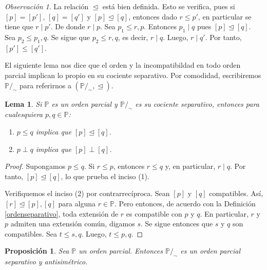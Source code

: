 \documentclass[11pt]{unam_tesis1}
\theoremstyle{MyThmStyle}
\theoremstyle{definition}
\theoremstyle{plain}
\newtheorem{lemma}[definition]{Lema}
\newtheorem{proposition}[definition]{Proposici\'on}
\theoremstyle{remark}
\newtheorem*{remark}{Observaci\'on}
\let\leq\leqslant
\begin{document}
\begin{remark}
La relaci\'on $\trianglelefteq$ est\'a bien definida. Esto se verifica, pues si $[p]=[p']$, $[q]=[q']$ y $[p]\trianglelefteq [q]$, entonces dado $r\leq p'$, en particular se tiene que $r\mid p'$. De donde $r\mid p$. Sea $p_1\leq r,p$. Entonces $p_1\mid q$ pues $[p]\trianglelefteq [q]$. Sea $p_2\leq p_1,q$. Se sigue que $p_2\leq r,q$, es decir, $r\mid q$. Luego, $r\mid q'$. Por tanto, $[p']\leq [q']$.
\end{remark}

El siguiente lema nos dice que el orden y la incompatibildad en todo orden parcial implican lo propio en su cociente separativo. Por comodidad, escribiremos $\mathbb P/_\sim$ para referirnos a $(\mathbb{P}/_\sim,\trianglelefteq)$.

\begin{lemma}\label{preservacionseparativa}
Si $\mathbb P$ es un orden parcial y $\mathbb P/_\sim$ es su cociente separativo, entonces para cualesquiera $p,q\in \mathbb P$:
\begin{enumerate}
\item $p\leq q$ implica que $[p]\trianglelefteq [q]$.
\item $p\perp q$ implica que $[p]\perp [q]$.
\end{enumerate}
\end{lemma}

\begin{proof}
Supongamos $p\leq q$. Si $r\leq p$, entonces $r\leq q$ y, en particular, $r\mid q$. Por tanto, $[p]\trianglelefteq [q]$, lo que prueba el inciso (1).

Verifiquemos el inciso (2) por contrarrec\'iproca. Sean $[p]$ y  $[q]$ compatibles. As\'i, $[r]\trianglelefteq [p],[q]$ para alguna $r\in \mathbb P$. Pero entonces, de acuerdo con la Definici\'on \ref{ordenseparativo}, toda extensi\'on de $r$ es compatible con $p$ y $q$. En particular, $r$ y $p$ admiten una extensi\'on com\'un, digamos $s$. Se sigue entonces que $s$ y $q$ son compatibles. Sea $t\leq s,q$. Luego, $t\leq p,q$.
\end{proof}

\begin{proposition}
Sea $\mathbb P$ un orden parcial. Entonces $\mathbb{P}/_\sim$ es un orden parcial separativo y antisim\'etrico.
\end{proposition}
\end{document}
